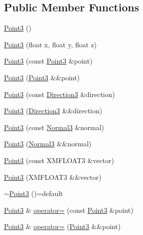 \subsection*{Public Member Functions}
\begin{DoxyCompactItemize}
\item 
\hyperlink{structmage_1_1_point3_a2675c303e54c6047520bc1a298c7fef1}{Point3} ()
\item 
\hyperlink{structmage_1_1_point3_a754210fa30befab6db5957a8d9b397f2}{Point3} (float x, float y, float z)
\item 
\hyperlink{structmage_1_1_point3_ad2e95e6eaa32339663e35f936990eb0c}{Point3} (const \hyperlink{structmage_1_1_point3}{Point3} \&point)
\item 
\hyperlink{structmage_1_1_point3_a3d10561285e01d03978e0d91fda6ff1d}{Point3} (\hyperlink{structmage_1_1_point3}{Point3} \&\&point)
\item 
\hyperlink{structmage_1_1_point3_a5ccb5f2f660b3ecdb471ed859923d4fc}{Point3} (const \hyperlink{structmage_1_1_direction3}{Direction3} \&direction)
\item 
\hyperlink{structmage_1_1_point3_ad189bc5943a8fac34495e38471534ffa}{Point3} (\hyperlink{structmage_1_1_direction3}{Direction3} \&\&direction)
\item 
\hyperlink{structmage_1_1_point3_ae56d0fb055b286df68d8d645378408c8}{Point3} (const \hyperlink{structmage_1_1_normal3}{Normal3} \&normal)
\item 
\hyperlink{structmage_1_1_point3_acab03c18e6b20bea3768e14cb1435302}{Point3} (\hyperlink{structmage_1_1_normal3}{Normal3} \&\&normal)
\item 
\hyperlink{structmage_1_1_point3_a2298bfe2417508187bdad7fbaa6178c1}{Point3} (const X\+M\+F\+L\+O\+A\+T3 \&vector)
\item 
\hyperlink{structmage_1_1_point3_a84b8c62ed63301fde1ce0e045c12352b}{Point3} (X\+M\+F\+L\+O\+A\+T3 \&\&vector)
\item 
\hyperlink{structmage_1_1_point3_a952151b6ff72b68569f95445c2ac2495}{$\sim$\+Point3} ()=default
\item 
\hyperlink{structmage_1_1_point3}{Point3} \& \hyperlink{structmage_1_1_point3_a53403b16c67a6c7d72910edaec04e371}{operator=} (const \hyperlink{structmage_1_1_point3}{Point3} \&point)
\item 
\hyperlink{structmage_1_1_point3}{Point3} \& \hyperlink{structmage_1_1_point3_a6889dad6ac4106bd9a52fcae4dfa401c}{operator=} (\hyperlink{structmage_1_1_point3}{Point3} \&\&point)
\end{DoxyCompactItemize}


